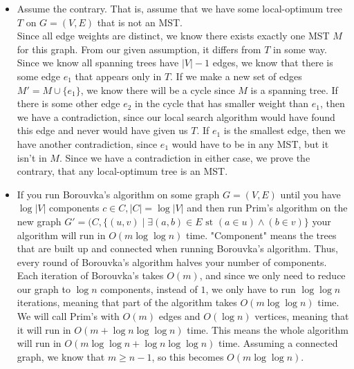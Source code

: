 \documentclass[11pt]{article}
\begin{document}
\begin{solution}
    \begin{itemize}
        \item Assume the contrary. That is, assume that we have some local-optimum tree $T$ on $G = (V, E)$ that is not an MST. 
            \\ Since all edge weights are distinct, we know there exists exactly one MST $M$ for this graph. 
            From our given assumption, it differs from $T$ in some way. Since we know all spanning trees have $|V| - 1$ edges, 
            we know that there is some edge $e_1$ that appears only in $T$. If we make a new set of edges $M' = M \cup \{e_1\}$, we know there
            will be a cycle since $M$ is a spanning tree. If there is some other edge $e_2$ in the cycle that has smaller weight 
            than $e_1$, then we have a contradiction, since our local search algorithm would have found this edge and never would have
            given us $T$. If $e_1$ is the smallest edge, then we have another contradiction, since $e_1$ would have to be in any MST, 
            but it isn't in $M$. Since we have a contradiction in either case, we prove the contrary, that any local-optimum tree is an MST.
        \item If you run Borouvka's algorithm on some graph $G = (V, E)$ until you have $\log |V|$ components $c \in C, |C| = \log |V|$ and then run Prim's algorithm on the new graph $G' = (C, \{(u, v) \mid \exists (a, b) \in E \text{ st } (a \in u) \land (b \in v)\}$ your algorithm will run
            in $O(m\log\log n)$ time. 
            "Component" means the trees that are built up and connected when running Borouvka's algorithm. Thus, every round of Borouvka's algorithm halves your number of components. 
            \\ Each iteration of Borouvka's takes $O(m)$, and since we only need to reduce our graph to $\log n$ components,
            instead of $1$, we only have to run $\log \log n$ iterations,
            meaning that part of the algorithm takes $O(m \log \log n)$ time. We will call Prim's with $O(m)$ edges and $O(\log n)$ vertices, meaning that it will run in $O(m + \log n \log \log n)$ time.
            This means the whole algorithm will run in $O(m \log \log n + \log n \log \log n)$ time. Assuming a connected graph, we know that $m \geq n - 1$,
            so this becomes $O(m \log \log n)$.
    \end{itemize}
\end{solution}
\end{document}
